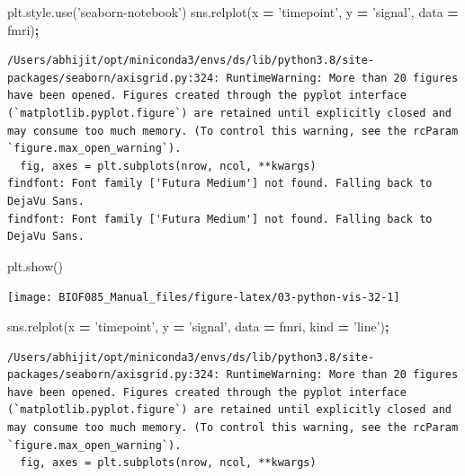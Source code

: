 \documentclass[
  letterpaper,
]{scrbook}
\newenvironment{Shaded}{\begin{snugshade}}{\end{snugshade}}
\newcommand{\NormalTok}[1]{#1}
\newcommand{\OperatorTok}[1]{\textcolor[rgb]{0.81,0.36,0.00}{\textbf{#1}}}
\newcommand{\StringTok}[1]{\textcolor[rgb]{0.31,0.60,0.02}{#1}}
\begin{document}
\begin{Shaded}
\begin{Highlighting}[]
\NormalTok{plt.style.use(}\StringTok{'seaborn-notebook'}\NormalTok{)}
\NormalTok{sns.relplot(x }\OperatorTok{=} \StringTok{'timepoint'}\NormalTok{, y }\OperatorTok{=} \StringTok{'signal'}\NormalTok{, data }\OperatorTok{=}\NormalTok{ fmri)}\OperatorTok{;}
\end{Highlighting}
\end{Shaded}

\begin{verbatim}
/Users/abhijit/opt/miniconda3/envs/ds/lib/python3.8/site-packages/seaborn/axisgrid.py:324: RuntimeWarning: More than 20 figures have been opened. Figures created through the pyplot interface (`matplotlib.pyplot.figure`) are retained until explicitly closed and may consume too much memory. (To control this warning, see the rcParam `figure.max_open_warning`).
  fig, axes = plt.subplots(nrow, ncol, **kwargs)
findfont: Font family ['Futura Medium'] not found. Falling back to DejaVu Sans.
findfont: Font family ['Futura Medium'] not found. Falling back to DejaVu Sans.
\end{verbatim}

\begin{Shaded}
\begin{Highlighting}[]
\NormalTok{plt.show()}
\end{Highlighting}
\end{Shaded}

\begin{center}\texttt{[image: BIOF085\_Manual\_files/figure-latex/03-python-vis-32-1]} \end{center}

\begin{Shaded}
\begin{Highlighting}[]
\NormalTok{sns.relplot(x }\OperatorTok{=} \StringTok{'timepoint'}\NormalTok{, y }\OperatorTok{=} \StringTok{'signal'}\NormalTok{, data }\OperatorTok{=}\NormalTok{ fmri, kind }\OperatorTok{=} \StringTok{'line'}\NormalTok{)}\OperatorTok{;}
\end{Highlighting}
\end{Shaded}

\begin{verbatim}
/Users/abhijit/opt/miniconda3/envs/ds/lib/python3.8/site-packages/seaborn/axisgrid.py:324: RuntimeWarning: More than 20 figures have been opened. Figures created through the pyplot interface (`matplotlib.pyplot.figure`) are retained until explicitly closed and may consume too much memory. (To control this warning, see the rcParam `figure.max_open_warning`).
  fig, axes = plt.subplots(nrow, ncol, **kwargs)
\end{verbatim}
\end{document}
